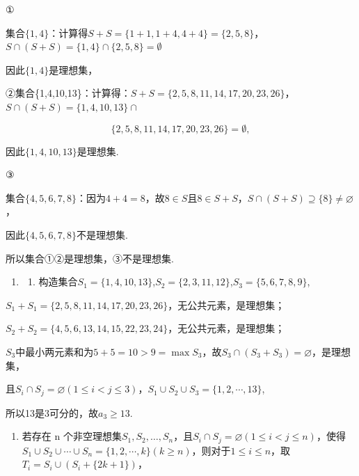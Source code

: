 \documentclass[11pt,a4paper]{ctexart}
\begin{document}
①

集合\(\{1,4\}\)：计算得\(S + S = \{1 + 1,1 + 4,4 + 4\} = \{2,5,8\}\)，\(S\cap (S + S) = \{1,4\} \cap \{2,5,8\} = \emptyset\)

因此\(\{1,4\}\)是理想集，

②集合\{1,4,10,13\}：计算得：\(S + S = \{2,5,8,11,14,17,20,23,26\}\)，\(S \cap (S + S) = \{1,4,10,13\} \cap\)

\[
\{2, 5, 8, 1 1, 1 4, 1 7, 2 0, 2 3, 2 6 \} = \emptyset ,
\]

因此\(\{1,4,10,13\}\)是理想集.

③

集合\(\{4,5,6,7,8\}\)：因为\(4+4=8\)，故\(8\in S\)且\(8\in S+S\)，\(S\cap(S+S)\supseteq\{8\}\neq\varnothing\)，

因此\(\{4,5,6,7,8\}\)不是理想集.

所以集合①②是理想集，③不是理想集.

\begin{enumerate}[label=\arabic*., leftmargin=*, start=2]
\item 

\begin{enumerate}
  \def\labelenumii{(\roman{enumii})}
  \item
    构造集合\(S_{1} = \{1,4,10,13\}\),\(S_{2} = \{2,3,11,12\}\),\(S_{3} = \{5,6,7,8,9\}\),
  \end{enumerate}
\end{enumerate}

\(S_{1} + S_{1} = \{2, 5, 8, 11, 14, 17, 20, 23, 26\}\)，无公共元素，是理想集；

\(S_{2} + S_{2} = \{4, 5, 6, 13, 14, 15, 22, 23, 24\}\)，无公共元素，是理想集；

\(S_{3}\)中最小两元素和为\(5 + 5 = 10 > 9 = \max S_{3}\)，故\(S_{3} \cap (S_{3} + S_{3}) = \varnothing\)，是理想集，

且\(S_{i} \cap S_{j} = \varnothing (1 \leq i < j \leq 3)\)，\(S_{1} \cup S_{2} \cup S_{3} = \{1, 2, \cdots, 13\}\),

所以13是3可分的，故\(a_{3} \geq 13\).

\begin{enumerate}[label=(\roman*), leftmargin=*, start=2]
\item 若存在 n
  个非空理想集\(S_{1}, S_{2}, \ldots, S_{n}\)，且\(S_{i} \cap S_{j} = \varnothing (1 \leq i < j \leq n)\)，使得\(S_{1} \cup S_{2} \cup \cdots \cup S_{n} = \{1, 2, \cdots, k\} (k \geq n)\)，则对于\(1 \leq i \leq n\)，取\(T_{i} = S_{i} \cup (S_{i} + \{2k + 1\})\)，
\end{enumerate}
\end{document}
